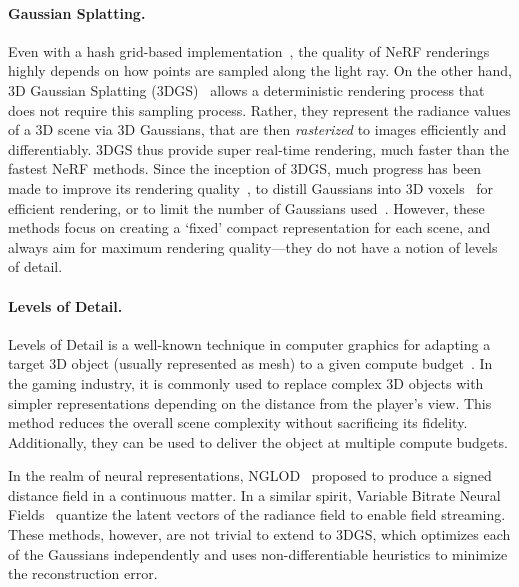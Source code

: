   \paragraph{Gaussian Splatting.}
    Even with a hash grid-based implementation~\cite{mueller2022instant}, the
    quality of NeRF renderings highly depends on how points are sampled along the
    light ray.
    On the other hand, 3D Gaussian Splatting (3DGS)~\cite{kerbl20233d} allows a
    deterministic rendering process that does not require this sampling process.
    Rather, they represent the radiance values of a 3D scene via 3D Gaussians,
    that are then \emph{rasterized} to images efficiently and differentiably.
    3DGS thus provide super real-time rendering, much faster than the fastest NeRF methods.
    Since the inception of 3DGS, much progress has been made to improve its
    rendering
    quality~\cite{taming3dgs2024mallick,bulo2024revising,huang20242d,jiang2024gaussianshader,liu2024citygaussian,girish2023eagles,kerbl2024hierarchical,radl2024stopthepop,yu2024mip},
    to distill Gaussians into 3D
    voxels~\cite{ren2024octree,lu2024scaffold,liu2024citygaussian} for efficient
    rendering, or to limit the number of Gaussians
    used~\cite{fan2023lightgaussian,niemeyer2024radsplat,lee2024compact,morgenstern2024compact,niedermayr2024compressed,fang2024mini}.
    However, these methods focus on creating a `fixed' compact representation for
    each scene, and always aim for maximum rendering quality---they do not have a
    notion of levels of detail.

  \paragraph{Levels of Detail.}
    Levels of Detail is a well-known technique in computer graphics for adapting a
    target 3D object (usually represented as mesh) to a given compute
    budget~\cite{clark1976hierarchical,niessner2012feature,luebke2002level}.
    In the gaming industry, it is commonly used to replace complex 3D objects with
    simpler representations depending on the distance from the player's view.
    This method reduces the overall scene complexity without sacrificing its
    fidelity.
    Additionally, they can be used to deliver the object at multiple compute
    budgets.

    In the realm of neural representations, NGLOD~\cite{takikawa2021neural}
    proposed to produce a signed distance field in a continuous matter.
    In a similar spirit, Variable Bitrate Neural
    Fields~\cite{takikawa2022variable} quantize the latent vectors of the radiance
    field to enable field streaming.
    These methods, however, are not trivial to extend to 3DGS, which optimizes
    each of the Gaussians independently and uses non-differentiable heuristics to
    minimize the reconstruction error.

